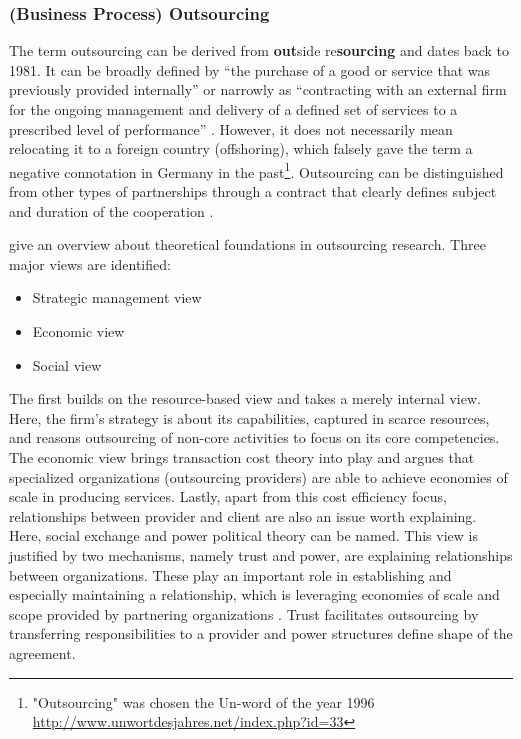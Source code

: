 			\subsubsection{(Business Process) Outsourcing}
			\label{sec:bpo}
		The term outsourcing can be derived from \textbf{out}side re\textbf{sourcing} and dates back to 1981\citep{oxford}. It can be broadly defined by \enquote{the purchase of a good or service that was previously provided internally} \citep[]{lacity1993} or narrowly as \enquote{contracting with an external firm for the ongoing management and delivery of a defined set of services to a prescribed level of performance} \citep[]{cohen2006multisourcing}. However, it does not necessarily mean relocating it to a foreign country (offshoring), which falsely gave the term a negative connotation in Germany in the past\footnote{ "Outsourcing" was chosen the Un-word of the year 1996 \url{http://www.unwortdesjahres.net/index.php?id=33}}. Outsourcing can be distinguished from other types of partnerships through a contract that clearly defines subject and duration of the cooperation \citep[]{gross2006}. 
		
		\cite{Lee:2000} give an overview about theoretical foundations in outsourcing research. Three major views are identified:
		
		\begin{itemize}
			\item Strategic management view
			\item Economic view
			\item Social view
		\end{itemize}
		
		The first builds on the resource-based view \citep{wernerfelt1984resource} and takes a merely internal view. Here, the firm's strategy is about its capabilities, captured in scarce resources, and reasons outsourcing of non-core activities to focus on its core competencies. The economic view brings transaction cost theory into play and argues that specialized organizations (outsourcing providers) are able to achieve economies of scale in producing services. Lastly, apart from this cost efficiency focus, relationships between provider and client are also an issue worth explaining. Here, social exchange and power political theory \citep{lee1999effect} can be named. This view is justified by two mechanisms, namely trust and power, are explaining relationships between organizations. These play an important role in establishing and especially maintaining a relationship, which is leveraging economies of scale and scope provided by partnering organizations \citep{rai1996critical}. Trust facilitates outsourcing by transferring responsibilities to a provider and power structures define shape of the agreement.
		
